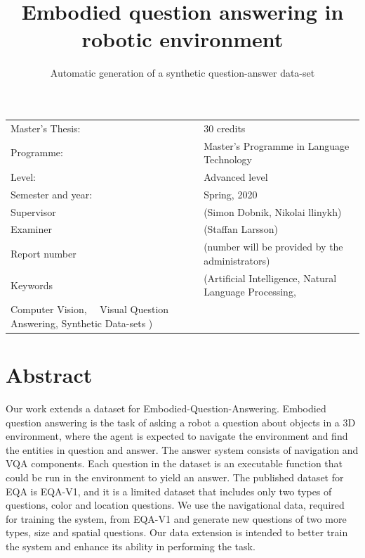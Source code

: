 \documentclass[11pt, a4paper]{article}
\title{Embodied question answering in\\ robotic environment}
\subtitle{Automatic generation of a synthetic question-answer data-set }
\author{}
\begin{document}
\begin{titlepage}

\maketitle

\vfill

\begingroup
\renewcommand*{\arraystretch}{1.2}
\begin{tabular}{l@{\hskip 20mm}l}
\hline
Master's Thesis: & 30 credits \\
Programme: & Master’s Programme in Language Technology\\
Level: & Advanced level \\
Semester and year: & Spring, 2020\\
Supervisor & (Simon Dobnik, Nikolai llinykh)\\
Examiner & (Staffan Larsson)\\
Report number & (number will be provided by the administrators) \\
Keywords & (Artificial Intelligence,  Natural Language Processing,\\ Computer Vision, \ \ Visual Question Answering, Synthetic Data-sets  ) 
\end{tabular}
\endgroup

\thispagestyle{empty}
\end{titlepage}

\newpage
\singlespacing
\section*{Abstract}
    Our work extends a dataset for Embodied-Question-Answering. Embodied question answering is the task of asking a robot a question about objects in a 3D environment, where the agent is expected to navigate the environment and find the entities in question and answer. The answer system consists of navigation and VQA components.  Each question in the dataset is an executable function that could be run in the environment to yield an answer.  The published dataset for EQA is EQA-V1, and it is a limited dataset that includes only two types of questions, color and location questions. We use the navigational data, required for training the system, from EQA-V1 and generate new questions of two more types, size and spatial questions. Our data extension is intended to better train the system and enhance its ability in performing the task. 
\end{document}
